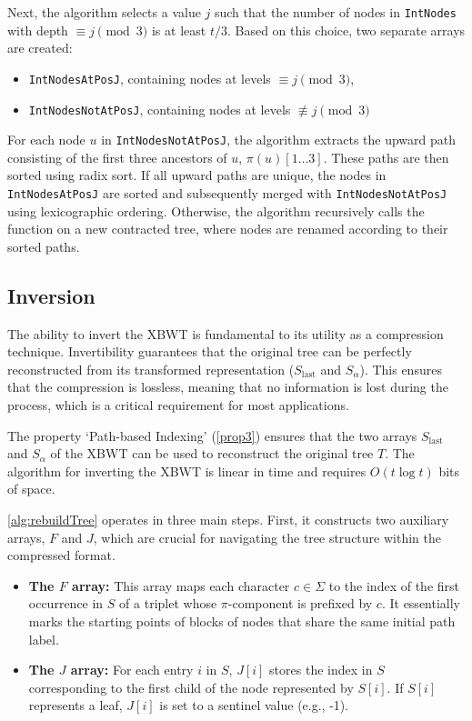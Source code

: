 Next, the algorithm selects a value $j$ such that the number of nodes in \texttt{IntNodes} with depth $\equiv j \pmod{3}$ is at least $t/3$. Based on this choice, two separate arrays are created:  
\begin{itemize}
    \item \texttt{IntNodesAtPosJ}, containing nodes at levels $\equiv j \pmod{3}$,
    \item \texttt{IntNodesNotAtPosJ}, containing nodes at levels $\not\equiv j \pmod{3}$
\end{itemize}

For each node $u$ in \texttt{IntNodesNotAtPosJ}, the algorithm extracts the upward path consisting of the first three ancestors of $u$, $\pi(u)[1 \dots 3]$. These paths are then sorted using radix sort. If all upward paths are unique, the nodes in \texttt{IntNodesAtPosJ} are sorted and subsequently merged with \texttt{IntNodesNotAtPosJ} using lexicographic ordering.
Otherwise, the algorithm recursively calls the {\pathsort} function on a new contracted tree, where nodes are renamed according to their sorted paths.

\subsection{Inversion}
The ability to invert the XBWT is fundamental to its utility as a compression technique. Invertibility guarantees that the original tree can be perfectly reconstructed from its transformed representation ($S_{\text{last}}$ and $S_{\alpha}$). This ensures that the compression is lossless, meaning that no information is lost during the process, which is a critical requirement for most applications.

The property `Path-based Indexing' (\cref{prop3}) ensures that the two arrays $S_{\text{last}}$ and $S_{\alpha}$ of the XBWT can be used to reconstruct the original tree $T$. The algorithm for inverting the XBWT is linear in time and requires $O(t \log t)$ bits of space.

\cref{alg:rebuildTree} operates in three main steps. First, it constructs two auxiliary arrays, $F$ and $J$, which are crucial for navigating the tree structure within the compressed format.

\begin{itemize}
    \item \textbf{The $F$ array:} This array maps each character $c \in \Sigma$ to the index of the first occurrence in $S$ of a triplet whose $\pi$-component is prefixed by $c$. It essentially marks the starting points of blocks of nodes that share the same initial path label.
    \item \textbf{The $J$ array:} For each entry $i$ in $S$, $J[i]$ stores the index in $S$ corresponding to the first child of the node represented by $S[i]$. If $S[i]$ represents a leaf, $J[i]$ is set to a sentinel value (e.g., -1).
\end{itemize}

